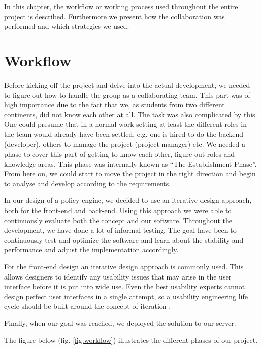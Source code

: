 In this chapter, the workflow or working process used throughout the entire project is described. Furthermore we present how the collaboration was performed and which strategies we used.

\section{Workflow} \label{sec:workflow}
Before kicking off the project and delve into the actual development, we needed to figure out how to handle the group as a collaborating team. This part was of high importance due to the fact that we, as students from two different continents, did not know each other at all. The task was also complicated by this. One could presume that in a normal work setting at least the different roles in the team would already have been settled, e.g. one is hired to do the backend (developer), others to manage the project (project manager) etc. We needed a phase to cover this part of getting to know each other, figure out roles and knowledge areas. This phase was internally known as ``The Establishment Phase''. From here on, we could start to move the project in the right direction and begin to analyse and develop according to the requirements.

In our design of a policy engine, we decided to use an iterative design approach, both for the front-end and back-end. Using this approach we were able to continuously evaluate both the concept and our software. Throughout the development, we have done a lot of informal testing. The goal have been to continuously test and optimize the software and learn about the stability and performance and adjust the implementation accordingly. 

For the front-end design an iterative design approach is commonly used. This allows designers to identify any usability issues that may arise in the user interface before it is put into wide use. Even the best usability experts cannot design perfect user interfaces in a single attempt, so a usability engineering life cycle should be built around the concept of iteration \cite{Nielsen1993}.

Finally, when our goal was reached, we deployed the solution to our server.

The figure below (fig. \ref{fig:workflow}) illustrates the different phases of our project.

